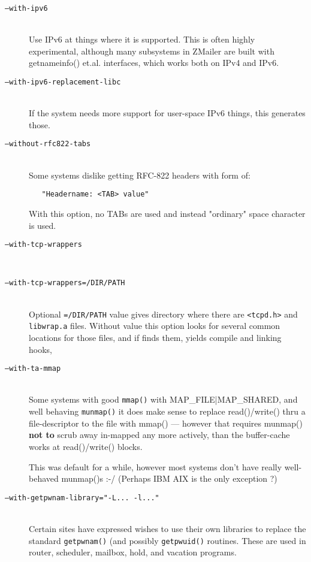 \begin{description}
\item[\tt ---with-ipv6] \mbox{} \\
Use IPv6 at things where it is supported.  This is often
highly experimental, although many subsystems in ZMailer
are built with   getnameinfo()  et.al. interfaces, which
works both on IPv4 and IPv6.

\item[\tt ---with-ipv6-replacement-libc] \mbox{} \\
If the system needs more support for user-space IPv6
things, this generates those.

\item[\tt ---without-rfc822-tabs] \mbox{} \\
Some systems dislike getting RFC-822 headers with form of:
\begin{verbatim}
   "Headername: <TAB> value"
\end{verbatim}
With this option, no TABs are used and instead "ordinary"
space character is used.

\item[\tt ---with-tcp-wrappers] \mbox{} \\
\item[\tt ---with-tcp-wrappers=/DIR/PATH] \mbox{} \\
Optional  {\tt =/DIR/PATH}  value gives directory where there are
{\tt <tcpd.h>}  and  {\tt libwrap.a}  files.
Without value this option looks for several common locations
for those files, and if finds them, yields compile and linking
hooks,

\item[\tt ---with-ta-mmap] \mbox{} \\
Some systems with good {\tt mmap()} with MAP\_FILE|MAP\_SHARED,
and well behaving  {\tt munmap()}  it does make sense to replace
read()/write() thru a file-descriptor to the file with
mmap() --- however that requires munmap() {\bf not to} scrub
away in-mapped any more actively, than the buffer-cache
works at read()/write() blocks.

This was default for a while, however most systems don't
have really well-behaved munmap()s :-/
(Perhaps IBM AIX is the only exception ?)

\item[\tt ---with-getpwnam-library="-L... -l..."] \mbox{} \\
Certain sites have expressed wishes to use their own libraries
to replace the standard {\tt getpwnam()} (and possibly {\tt getpwuid()}
routines.
These are used in router, scheduler, mailbox, hold, and vacation
programs.


\end{description}
